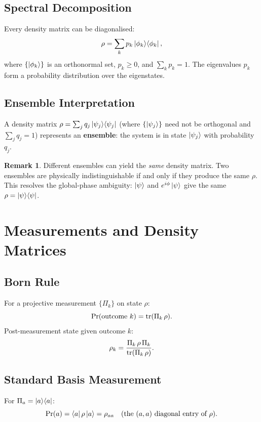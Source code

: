 \documentclass[11pt]{article}
\theoremstyle{definition}
\newtheorem{remark}{Remark}[section]
\begin{document}
\subsection{Spectral Decomposition}

Every density matrix can be diagonalised:
\[
    \rho = \sum_k p_k\ket{\phi_k}\!\bra{\phi_k},
\]
where $\{\ket{\phi_k}\}$ is an orthonormal set, $p_k\ge 0$, and $\sum_k p_k=1$.  The eigenvalues $p_k$ form a probability distribution over the eigenstates.

\subsection{Ensemble Interpretation}

A density matrix $\rho=\sum_j q_j\ket{\psi_j}\!\bra{\psi_j}$ (where $\{\ket{\psi_j}\}$ need not be orthogonal and $\sum_j q_j=1$) represents an \textbf{ensemble}: the system is in state $\ket{\psi_j}$ with probability $q_j$.

\begin{remark}
Different ensembles can yield the \emph{same} density matrix.  Two ensembles are physically indistinguishable if and only if they produce the same $\rho$.  This resolves the global-phase ambiguity: $\ket{\psi}$ and $e^{i\phi}\ket{\psi}$ give the same $\rho=\ket{\psi}\!\bra{\psi}$.
\end{remark}

\section{Measurements and Density Matrices}

\subsection{Born Rule}

For a projective measurement $\{\Pi_k\}$ on state $\rho$:
\[
    \Pr(\text{outcome }k) = \tr(\Pi_k\,\rho).
\]
Post-measurement state given outcome $k$:
\[
    \rho_k = \frac{\Pi_k\,\rho\,\Pi_k}{\tr(\Pi_k\,\rho)}.
\]

\subsection{Standard Basis Measurement}

For $\Pi_a=\ket{a}\!\bra{a}$:
\[
    \Pr(a) = \bra{a}\rho\ket{a} = \rho_{aa} \quad\text{(the $(a,a)$ diagonal entry of $\rho$)}.
\]
\end{document}
